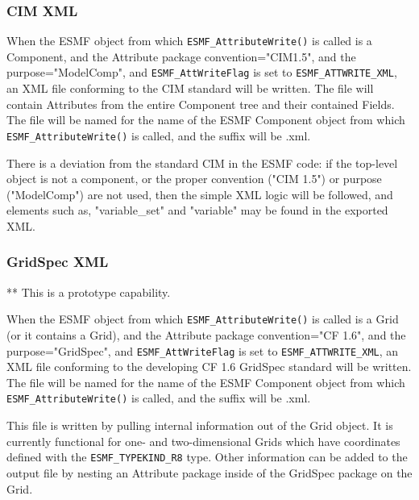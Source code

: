 \subsubsection{CIM XML}

\begin{sloppypar}
When the ESMF object from which {\tt ESMF\_AttributeWrite()} is called is a Component, and the Attribute package convention="CIM1.5", and the purpose="ModelComp", and {\tt ESMF\_AttWriteFlag} is set to {\tt ESMF\_ATTWRITE\_XML}, an XML file conforming to the CIM standard will be written.  The file will contain Attributes from the entire Component tree and their contained Fields.  The file will be named for the name of the ESMF Component object from which {\tt ESMF\_AttributeWrite()} is called, and the suffix will be .xml.
\end{sloppypar}

\begin{sloppypar}
There is a deviation from the standard CIM in the ESMF code: if the top-level object is not a component, or the proper convention ("CIM 1.5") or purpose ("ModelComp") are not used, then the simple XML logic will be followed, and elements such as, "variable\_set" and "variable" may be found in the exported XML.
\end{sloppypar}

\subsubsection{GridSpec XML}

** This is a prototype capability.

When the ESMF object from which {\tt ESMF\_AttributeWrite()} is called is a Grid (or 
it contains a Grid), and the Attribute package convention="CF 1.6", and the 
purpose="GridSpec", and {\tt ESMF\_AttWriteFlag} is set to {\tt ESMF\_ATTWRITE\_XML}, an XML file conforming to the developing CF 1.6 GridSpec standard will be written.  The file will be named for the name of the ESMF Component object from which {\tt ESMF\_AttributeWrite()} is called, and the suffix will be .xml.

This file is written by pulling internal information out of the Grid object.  It is 
currently functional for one- and two-dimensional Grids which have coordinates defined 
with the {\tt ESMF\_TYPEKIND\_R8} type.  Other information can be added to the output
file by nesting an Attribute package inside of the GridSpec package on the Grid.
